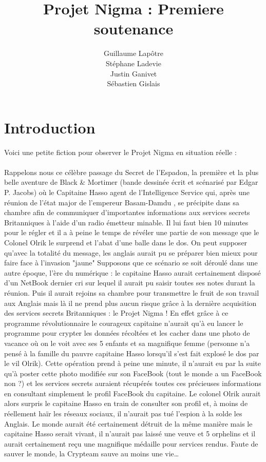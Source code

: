 \documentclass[a4paper,12pt]{article}
\title{Projet Nigma : Premiere soutenance}
\author{Guillaume Lapôtre\\Stéphane Ladevie\\Justin Ganivet\\Sébastien Gislais}
\begin{document}
	\maketitle{}
	\newpage
	\tableofcontents
	\newpage
	\section{Introduction}
		Voici une petite fiction pour observer le Projet Nigma en situation réelle :\\ \\
Rappelons nous ce célèbre passage du Secret de l’Espadon, la première et la plus belle aventure de Black \& Mortimer (bande dessinée écrit et scénarisé par Edgar P. Jacobs) où le Capitaine Hasso agent de l’Intelligence Service qui, après une réunion de l’état major de l’empereur Basam-Damdu , se précipite dans sa chambre afin de communiquer d’importantes informations aux services secrets Britanniques à l’aide d’un radio émetteur minable. Il lui faut bien 10 minutes pour le régler et il a à peine le temps de révéler une partie de son message que le Colonel Olrik le surprend et l’abat d’une balle dans le dos. On peut supposer qu’avec la totalité du message, les anglais aurait pu se préparer bien mieux pour faire face à l’invasion "jaune" Supposons que ce scénario se soit déroulé dans une autre époque, l’ère du numérique : le capitaine Hasso aurait certainement disposé d’un NetBook dernier cri sur lequel il aurait pu saisir toutes ses notes durant la réunion. Puis il aurait rejoins sa chambre pour transmettre le fruit de son travail aux Anglais mais là il ne prend plus aucun risque grâce à la dernière acquisition des services secrets Britanniques : le Projet Nigma ! En effet grâce à ce programme révolutionnaire le courageux capitaine n’aurait qu’à eu lancer le programme pour crypter les données récoltées et les cacher dans une photo de vacance où on le voit avec ses 5 enfants et sa magnifique femme (personne n’a pensé  à la famille du pauvre capitaine Hasso lorsqu’il s’est fait explosé le dos par le vil Olrik). Cette opération prend à peine une minute, il n’aurait eu par la suite qu’à poster  cette photo modifiée sur son FaceBook (tout le monde a un FaceBook non ?) et les services secrets auraient récupérés toutes ces précieuses informations en consultant simplement le profil FaceBook du capitaine. Le colonel Olrik aurait alors surpris le capitaine Hasso en train de consulter son profil et, à moins de réellement haïr les réseaux sociaux, il n’aurait pas tué l’espion à la solde les Anglais. Le monde aurait été certainement détruit de la même manière mais le capitaine Hasso serait vivant, il n’aurait pas laissé une veuve et 5 orphelins et il aurait certainement reçu une magnifique médaille pour services rendus. Faute de sauver le monde, la Crypteam sauve au moins une vie\dots
\end{document}
